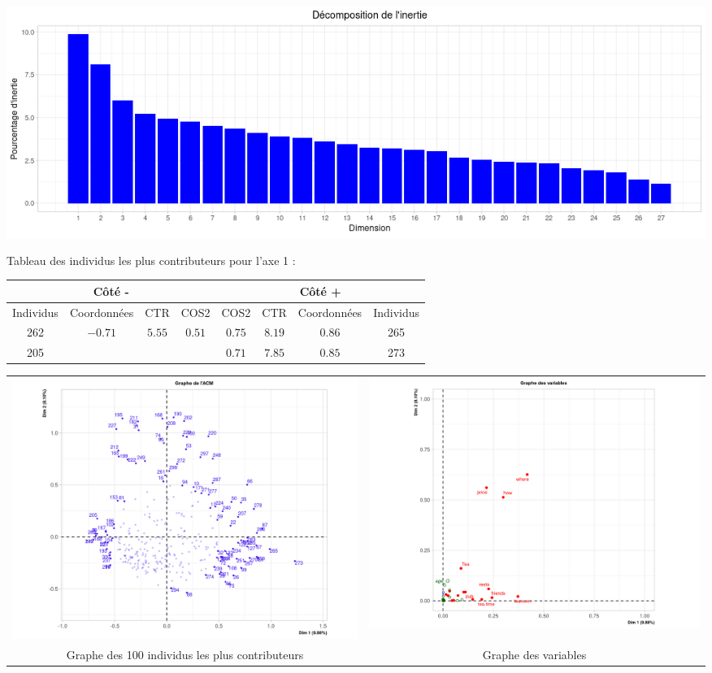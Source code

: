 \documentclass{article}
\begin{document}
\begin{enumerate}
\begin{enumerate}
\begin{center} \includegraphics[width=\linewidth]{image/vp.png}\end{center}	                      
	
	Tableau des individus les plus contributeurs pour l'axe 1 : 
	
	\begin{center}
\begin{tabular}{|c|c|c|c||c|c|c|c|}
\multicolumn{4}{c}{Côté -} & \multicolumn{4}{c}{Côté +}\\
\hline 
Individus & Coordonnées & CTR & COS2 & COS2 & CTR & Coordonnées & Individus \\ 
\hline 
262 & $-0.71$ & $5.55$ & $0.51$ & $0.75$ & $8.19$ & $0.86$ & 265  \\ 
\hline 
205 &  &  &  & $0.71$ & $7.85$ & $0.85$ & 273\\  
\hline 
\end{tabular} 
\end{center}

\begin{center}
\begin{tabular}{cc}
\includegraphics[width=0.48\linewidth]{image/indiv_100} &  \includegraphics[width=0.48\linewidth]{image/variables} \\
Graphe des 100 individus les plus contributeurs & Graphe des variables 
\end{tabular} 
\end{center}




\end{enumerate}
\end{enumerate}
\end{document}
